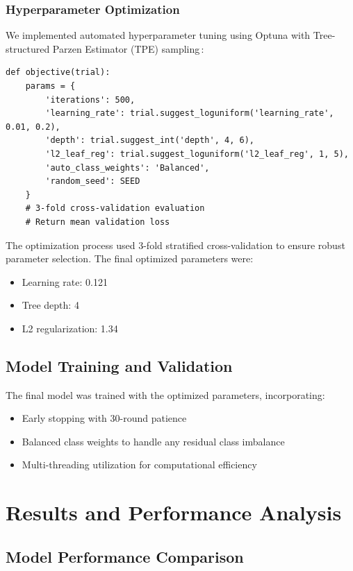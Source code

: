 \documentclass[11pt,a4paper]{article}
\begin{document}
\subsubsection{Hyperparameter Optimization}
We implemented automated hyperparameter tuning using Optuna with Tree-structured Parzen Estimator (TPE) sampling\,\cite{akiba2019optuna}:

\begin{lstlisting}
def objective(trial):
    params = {
        'iterations': 500,
        'learning_rate': trial.suggest_loguniform('learning_rate', 0.01, 0.2),
        'depth': trial.suggest_int('depth', 4, 6),
        'l2_leaf_reg': trial.suggest_loguniform('l2_leaf_reg', 1, 5),
        'auto_class_weights': 'Balanced',
        'random_seed': SEED
    }
    # 3-fold cross-validation evaluation
    # Return mean validation loss
\end{lstlisting}

The optimization process used 3-fold stratified cross-validation to ensure robust parameter selection. The final optimized parameters were:
\begin{itemize}
    \item Learning rate: 0.121
    \item Tree depth: 4
    \item L2 regularization: 1.34
\end{itemize}

\subsection{Model Training and Validation}

The final model was trained with the optimized parameters, incorporating:
\begin{itemize}
    \item Early stopping with 30-round patience
    \item Balanced class weights to handle any residual class imbalance
    \item Multi-threading utilization for computational efficiency
\end{itemize}

\section{Results and Performance Analysis}
\label{sec:results}

\subsection{Model Performance Comparison}
\end{document}
